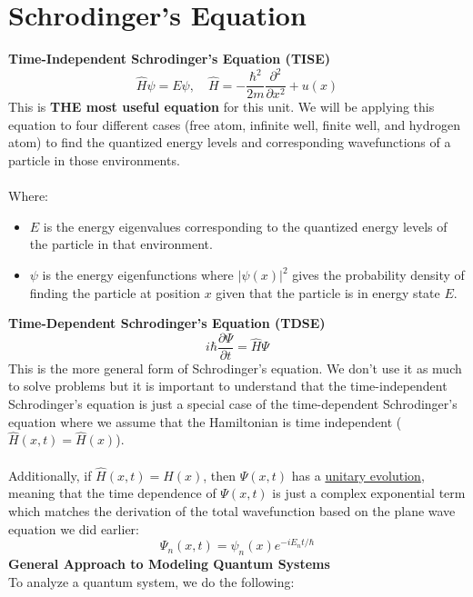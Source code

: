 \documentclass[12pt]{article}
\begin{document}
\section*{Schrodinger's Equation}
\textbf{Time-Independent Schrodinger's Equation (TISE)}\\
\[\boxed{\hat{H}\psi = E\psi,\quad \hat{H} = -\frac{\hbar^2}{2m} \frac{\partial^2}{\partial x^2} + u(x)}\]
This is \textbf{THE most useful equation} for this unit. We will be applying this equation to four different cases (free atom, infinite well, finite well, and hydrogen atom) to find the quantized energy levels and corresponding wavefunctions of a particle in those environments.\\\\
Where:
\begin{itemize}
    \item $E$ is the energy eigenvalues corresponding to the quantized energy levels of the particle in that environment.
    \item $\psi$  is the energy eigenfunctions where $|\psi(x)|^2$ gives the probability density of finding the particle at position $x$ given that the particle is in energy state $E$.
\end{itemize}
\textbf{Time-Dependent Schrodinger's Equation (TDSE)}
\[\boxed{i\hbar \frac{\partial \Psi}{\partial t} = \hat{H} \Psi}\]
This is the more general form of Schrodinger's equation. We don't use it as much to solve problems but it is important to understand that the time-independent Schrodinger's equation is just a special case of the time-dependent Schrodinger's equation where we assume that the Hamiltonian is time independent ($\hat{H}(x,t) = \hat{H}(x)$).\\\\
Additionally, if $\hat{H}(x,t) = \hat{H}(x)$, then $\Psi(x,t)$ has a \underline{unitary evolution}, meaning that the time dependence of $\Psi(x,t)$ is just a complex exponential term which matches the derivation of the total wavefunction based on the plane wave equation we did earlier:
\[\Psi_n(x,t) = \psi_n(x)e^{-iE_n t/\hbar}\]
\textbf{General Approach to Modeling Quantum Systems}\\
To analyze a quantum system, we do the following:
\end{document}
